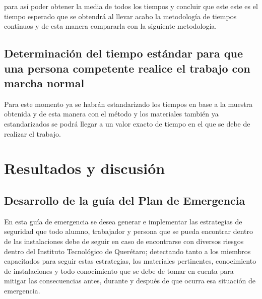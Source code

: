         para así poder obtener la media de todos los tiempos y concluir que este este es el tiempo esperado que se obtendrá al llevar acabo la metodología de tiempos continuos y de esta manera compararla con la siguiente metodología.

     \subsection{Determinación del tiempo estándar para que una persona competente realice el trabajo con marcha normal}
Para este momento ya se habrán estandarizado los tiempos en base a la muestra obtenida y de esta manera con el método y los materiales también ya estandarizados se podrá llegar a un valor exacto de tiempo en el que se debe de realizar el trabajo.
    
    

    
    
    \newpage
    \section{Resultados y discusión}

    \subsection{Desarrollo de la guía del Plan de Emergencia}

    En esta guía de emergencia se desea generar e implementar las estrategias de seguridad que todo alumno, trabajador y  persona que se pueda encontrar dentro de las instalaciones debe de seguir en caso de encontrarse con diversos riesgos dentro del Instituto Tecnológico de Querétaro; detectando tanto a los miembros capacitados para seguir estas estrategias, los materiales pertinentes, conocimiento de instalaciones y todo conocimiento que se debe de tomar en cuenta para mitigar las consecuencias antes, durante y después de que ocurra esa situación de emergencia.
    

